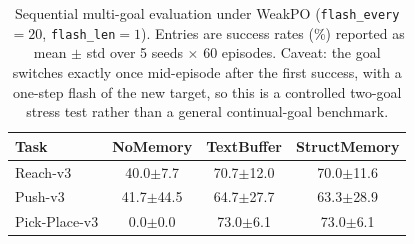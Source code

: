 \begin{table}[t]
\centering
\caption{Sequential multi-goal evaluation under WeakPO (\texttt{flash\_every}$=20$, \texttt{flash\_len}$=1$). Entries are success rates (\%) reported as mean $\pm$ std over 5 seeds $\times$ 60 episodes. Caveat: the goal switches exactly once mid-episode after the first success, with a one-step flash of the new target, so this is a controlled two-goal stress test rather than a general continual-goal benchmark.}
\label{tab:multi_goal}
\begin{tabular}{l ccc}
\toprule
Task & NoMemory & TextBuffer & StructMemory \\
\midrule
Reach-v3 & 40.0$\pm$7.7 & 70.7$\pm$12.0 & 70.0$\pm$11.6 \\
Push-v3 & 41.7$\pm$44.5 & 64.7$\pm$27.7 & 63.3$\pm$28.9 \\
Pick-Place-v3 & 0.0$\pm$0.0 & 73.0$\pm$6.1 & 73.0$\pm$6.1 \\
\bottomrule
\end{tabular}
\end{table}
